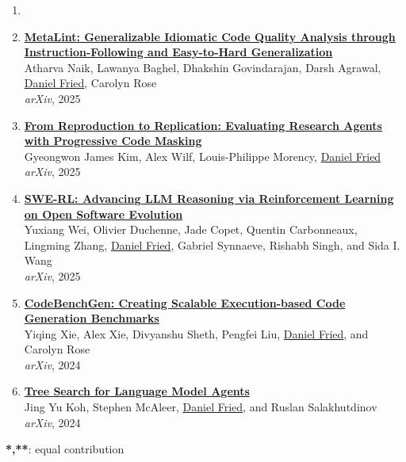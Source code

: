 \begin{enumerate}[leftmargin=-1mm,partopsep=0pt]
\item[]

\item \href{https://arxiv.org/abs/2507.11687}{\textbf{MetaLint: Generalizable Idiomatic Code Quality Analysis through Instruction-Following and Easy-to-Hard Generalization}} \\
  Atharva Naik, Lawanya Baghel, Dhakshin Govindarajan, Darsh Agrawal, \underline{Daniel Fried}, Carolyn Rose\\
  \emph{arXiv}, 2025

\item \href{https://arxiv.org/abs/2506.19724}{\textbf{From Reproduction to Replication: Evaluating Research Agents with Progressive Code Masking}} \\
  Gyeongwon James Kim, Alex Wilf, Louis-Philippe Morency, \underline{Daniel Fried}\\
  \emph{arXiv}, 2025

\item \href{https://arxiv.org/abs/2502.18449}{\textbf{SWE-RL: Advancing LLM Reasoning via Reinforcement Learning on Open Software Evolution}} \\
  Yuxiang Wei, Olivier Duchenne, Jade Copet, Quentin Carbonneaux, Lingming Zhang, \underline{Daniel Fried}, Gabriel Synnaeve, Rishabh Singh, and Sida I. Wang\\
  \emph{arXiv}, 2025

\item \href{https://arxiv.org/abs/2404.00566}{\textbf{CodeBenchGen: Creating Scalable Execution-based Code Generation Benchmarks}} \\
  Yiqing Xie, Alex Xie, Divyanshu Sheth, Pengfei Liu, \underline{Daniel Fried}, and Carolyn Rose\\
  \emph{arXiv}, 2024

\item \href{https://arxiv.org/abs/2407.01476}{\textbf{Tree Search for Language Model Agents}} \\
  Jing Yu Koh, Stephen McAleer, \underline{Daniel Fried}, and Ruslan Salakhutdinov\\
  \emph{arXiv}, 2024

\end{enumerate}

\textbf{*,**}: equal contribution
